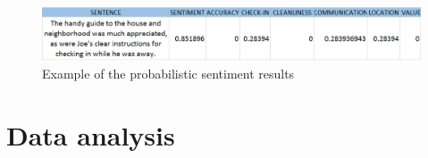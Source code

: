 \begin{figure}[h!]
	\centering
	\includegraphics[height=0.1\textheight]{example_pip}
	\caption{Example of the probabilistic sentiment results}
	\label{fig:sent}
\end{figure}
%

\section{Data analysis}

% 
%
